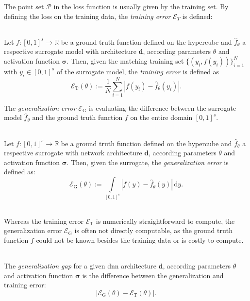 The point set $\mathcal{P}$ in the loss function is usually given by the training set. By defining the loss on the training data, the \emph{training error} $\mathcal{E}_T$ is defined:

\begin{definition} \ \\
Let $f:[0,1]^s \to \mathbb{R}$ be a ground truth function defined on the
hypercube and $\hat{f}_\theta$ a respective surrogate model with architecture
$\mathbf{d}$, according parameters $\theta$ and activation function
$\boldsymbol{\sigma}$. Then, given the matching training set $\{(y_i,
f(y_i))\}_{i=1}^N$ with $y_i \in [0,1]^s$ of the surrogate model, the
\emph{training error} is defined as
 \begin{equation*}
\mathcal{E}_\mathrm{T}(\theta) := \frac{1}{N} \sum_{i=1}^N |f(y_i) - \hat{f}_\theta(y_i)|.
 \end{equation*}
\end{definition}

The \emph{generalization error} $\mathcal{E}_\mathrm{G}$ is evaluating the
difference between the surrogate model $\hat{f}_\theta$ and the ground truth
function $f$ on the entire domain $[0,1]^s$.

\begin{definition} \ \\
Let $f:[0,1]^s\to\mathbb{R}$ be a ground truth function defined on the hypercube
and $\hat{f}_\theta$ a respective surrogate with network architecture
$\mathbf{d}$, according parameters $\theta$ and activation function
$\boldsymbol{\sigma}$. Then, given the surrogate, the \emph{generalization
error} is defined as:
\begin{equation*}
\mathcal{E}_\mathrm{G}(\theta) := \int\limits_{[0,1]^s} |f(y) - \hat{f}_\theta(y)| \, \mathrm{d}y.
\end{equation*}
\end{definition}

\begin{remark} \ \\
    Whereas the training error $\mathcal{E}_\mathrm{T}$ is numerically
    straightforward to compute, the generalization error
    $\mathcal{E}_\mathrm{G}$ is often not directly computable, as the ground
    truth function $f$ could not be known besides the training data or is costly
    to compute.
\end{remark}

\begin{definition} \ \\
    The \emph{generalization gap} for a given \ac{dnn} architecture
    $\mathbf{d}$, according parameters $\theta$ and activation function
    $\boldsymbol{\sigma}$ is the difference between the generalization and
    training error:
    \begin{equation*}
        |\mathcal{E}_\mathrm{G}(\theta) - \mathcal{E}_\mathrm{T}(\theta)|.
    \end{equation*}
\end{definition}


